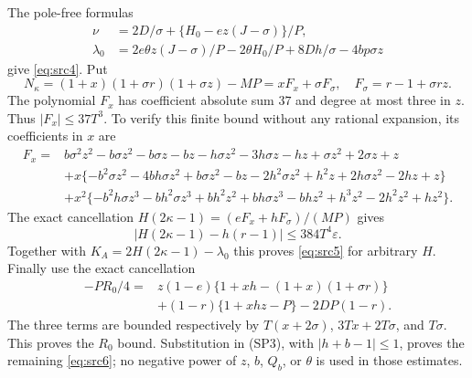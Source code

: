 \documentclass[11pt]{article}
\newcommand{\eps}{\varepsilon}
\newcommand{\sigs}{\sigma}
\begin{document}
The pole-free formulas
\begin{align*}
 \nu&=2D/\sigs+\{H_0-ez(J-\sigs)\}/P,\\
 \lambda_0&=2e\theta z(J-\sigs)/P-2\theta H_0/P
                         +8Dh/\sigs-4bp\sigs z
\end{align*}
give \eqref{eq:src4}. Put
\[
 N_\kappa=(1+x)(1+\sigs r)(1+\sigs z)-MP=xF_x+\sigs F_\sigs,
 \quad F_\sigs=r-1+\sigs rz.
\]
The polynomial $F_x$ has coefficient absolute sum $37$ and degree at
most three in $z$. Thus $|F_x|\le37T^3$. To verify this finite bound
without any rational expansion, its coefficients in $x$ are
\begin{align*}
 F_x={}&b\sigs^2z^2-b\sigs z^2-b\sigs z-bz
 -h\sigs z^2-3h\sigs z-hz+\sigs z^2+2\sigs z+z\\
 &+x\{-b^2\sigs z^2-4bh\sigs z^2+b\sigs z^2-bz
 -2h^2\sigs z^2+h^2z+2h\sigs z^2-2hz+z\}\\
 &+x^2\{-b^2h\sigs z^3-bh^2\sigs z^3+bh^2z^2
 +bh\sigs z^3-bhz^2+h^3z^2-2h^2z^2+hz^2\}.
\end{align*}
The exact cancellation
$H(2\kappa-1)=(eF_x+hF_\sigs)/(MP)$ gives
\[
 |H(2\kappa-1)-h(r-1)|\le384T^4\eps.
\]
Together with $K_A=2H(2\kappa-1)-\lambda_0$ this proves
\eqref{eq:src5} for arbitrary $H$.
Finally use the exact cancellation
\begin{align*}
 -PR_0/4={}&z(1-e)\{1+xh-(1+x)(1+\sigs r)\}\\
 &+(1-r)\{1+xhz-P\}-2DP(1-r).
\end{align*}
The three terms are bounded respectively by
$T(x+2\sigs)$, $3Tx+2T\sigs$, and $T\sigs$.
This proves the $R_0$ bound. Substitution in (SP3), with
$|h+b-1|\le1$, proves the remaining \eqref{eq:src6}; no negative
power of $z$, $b$, $Q_b$, or $\theta$ is used in those estimates.
\end{document}
